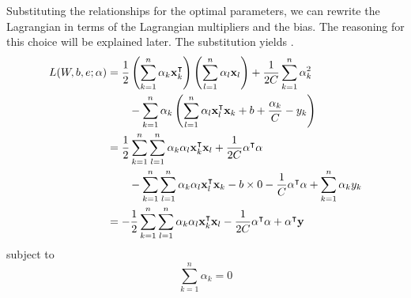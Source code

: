 Substituting the relationships for the optimal parameters, we can rewrite the Lagrangian in terms of the Lagrangian multipliers and the bias. The reasoning for this choice will be explained later. The substitution yields .
\begin{align}
   & \begin{aligned}
       L(W,b,e;\vb{\alpha}) & =  \frac{1}{2}\left(\sum_{k=1}^{n}\alpha_{k}\vb{x}_{k}^{\intercal}\right)\left(\sum_{l=1}^{n}\alpha_{l}\vb{x}_{l}\right) + \frac{1}{2C}\sum_{k=1}^{n}\alpha_{k}^{2} \\
                            & \qquad - \sum_{k=1}^{n}\alpha_{k} \left(\sum_{l=1}^{n}\alpha_{l}\vb{x}_{l}^{\intercal}\vb{x}_{k}+b+\frac{\alpha_{k}}{C} - y_{k} \right)
     \end{aligned}        \\
   & \begin{aligned}
       \phantom{L(W,b,e;\vb{\alpha})} & =  \frac{1}{2}\sum_{k=1}^{n}\sum_{l=1}^{n}\alpha_{k}\alpha_{l}\vb{x}_{k}^{\intercal}\vb{x}_{l} + \frac{1}{2C}\vb{\alpha}^{\intercal}\vb{\alpha}                                      \\
                                      & \qquad - \sum_{k=1}^{n}\sum_{l=1}^{n}\alpha_{k}\alpha_{l}\vb{x}_{l}^{\intercal}\vb{x}_{k} -b\times 0 - \frac{1}{C}\vb{\alpha}^{\intercal}\vb{\alpha} + \sum_{k=1}^{n}\alpha_{k}y_{k}
     \end{aligned} \nonumber \\
   & \begin{aligned}
       \phantom{L(W,b,e;\vb{\alpha})} & =  -\frac{1}{2}\sum_{k=1}^{n}\sum_{l=1}^{n}\alpha_{k}\alpha_{l}\vb{x}_{k}^{\intercal}\vb{x}_{l} - \frac{1}{2C}\vb{\alpha}^{\intercal}\vb{\alpha} + \vb{\alpha}^{\intercal}\vb{y} \\
     \end{aligned}\label{eq:lssvr_dual}
\end{align}
subject to
\begin{equation}
  \sum_{k=1}^{n}\alpha_{k} = 0
\end{equation}

